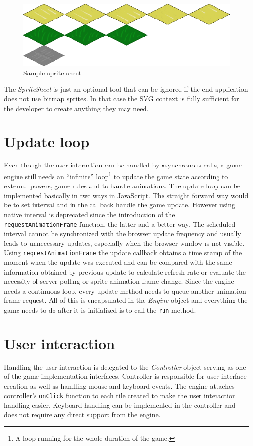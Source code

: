 \documentclass[11pt,oneside, final]{fithesis2}
\begin{document}
\begin{figure}[h]
	\centering
	\includegraphics[width=\textwidth]{thesis-spritesheet}
	\caption{Sample sprite-sheet}
	\label{spritesheet}
\end{figure}

The \emph{SpriteSheet} is just an optional tool that can be ignored if the end application does not use bitmap sprites. In that case the SVG context is fully sufficient for the developer to create anything they may need.

\section{Update loop}
Even though the user interaction can be handled by asynchronous calls, a game engine still needs an ``infinite'' loop\footnote{A loop running for the whole duration of the game.} to update the game state according to external powers, game rules and to handle animations. The update loop can be implemented basically in two ways in JavaScript. The straight forward way would be to set interval and in the callback handle the game update. However using native interval is deprecated since the introduction of the \texttt{requestAnimationFrame} function\cite{raf}, the latter and a better way. The scheduled interval cannot be synchronized with the browser update frequency and usually leads to unnecessary updates, especially when the browser window is not visible\cite{animationtiming}. Using \texttt{requestAnimationFrame} the update callback obtains a time stamp of the moment when the update was executed and can be compared with the same information obtained by previous update to calculate refresh rate or evaluate the necessity of server polling or sprite animation frame change. Since the engine needs a continuous loop, every update method needs to queue another animation frame request\cite{raf}. All of this is encapsulated in the \emph{Engine} object and everything the game needs to do after it is initialized is to call the \texttt{run} method.

\section{User interaction}
Handling the user interaction is delegated to the \emph{Controller} object serving as one of the game implementation interfaces. Controller is responsible for user interface creation as well as handling mouse and keyboard events. The engine attaches controller's \texttt{onClick} function to each tile created to make the user interaction handling easier. Keyboard handling can be implemented in the controller and does not require any direct support from the engine.
\end{document}
